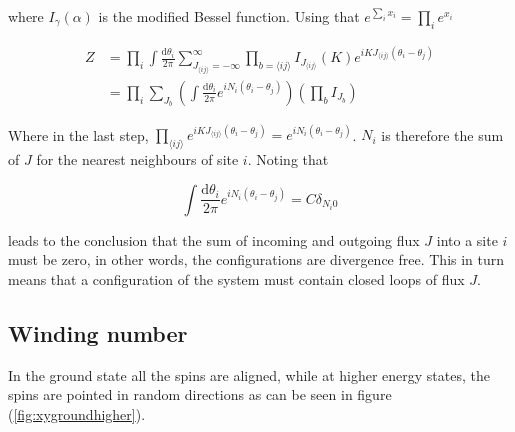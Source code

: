 where $I_\gamma(\alpha)$ is the modified Bessel function. Using that $e^{\sum_i x_i} = \prod_i e^{x_i}$

\begin{align}
    Z &= \prod_i \int \frac{\mathrm d \theta_i}{2 \pi} \sum_{J_{\langle ij \rangle} = -\infty}^{\infty} \prod_{b = \langle ij \rangle} I_{J_{\langle ij \rangle}} ( K ) e^{iK J_{\langle ij \rangle} (\theta_i - \theta_j)} \\
\label{eq:xypart2}
% 
    &=  \prod_i \sum_{J_b} \left ( \int \frac{\mathrm d \theta_i}{2 \pi} e^{i N_i (\theta_i - \theta_j)} \right ) \left ( \prod_b I_{J_b} \right ) 
\end{align}

Where in the last step, $\prod_{\langle ij \rangle} e^{iKJ_{\langle ij \rangle} (\theta_i - \theta_j)} = e^{iN_i (\theta_i - \theta_j)}$. $N_i$ is therefore the sum of $J$ for the nearest neighbours of site $i$. Noting that

\begin{equation}
    \int \frac{\mathrm d \theta_i}{2 \pi} e^{i N_i (\theta_i - \theta_j)} = C \delta_{N_i 0}
\end{equation}

leads to the conclusion that the sum of incoming and outgoing flux $J$ into a site $i$ must be zero, in other words, the configurations are divergence free. This in turn means that a configuration of the system must contain closed loops of flux $J$.


\subsection{Winding number}
\label{subsec:XYWindingNum}

In the ground state all the spins are aligned, while at higher energy states, the spins are pointed in random directions as can be seen in figure (\ref{fig:xygroundhigher}).

